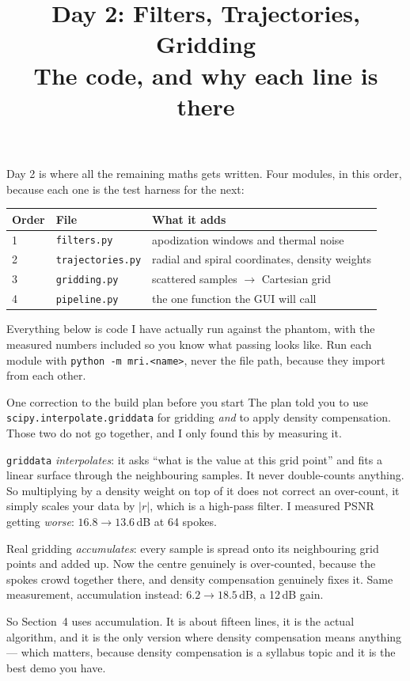 \documentclass[11pt,a4paper]{article}
\title{\textbf{Day 2: Filters, Trajectories, Gridding}\\[4pt]
\large The code, and why each line is there}
\author{}
\date{}
\begin{document}
\maketitle
\vspace{-2.1cm}

\section*{}

Day 2 is where all the remaining maths gets written. Four modules, in this
order, because each one is the test harness for the next:

\begin{center}
\begin{tabular}{@{}llp{7.6cm}@{}}
\toprule
\textbf{Order} & \textbf{File} & \textbf{What it adds} \\
\midrule
1 & \texttt{filters.py} & apodization windows and thermal noise \\
2 & \texttt{trajectories.py} & radial and spiral coordinates, density weights \\
3 & \texttt{gridding.py} & scattered samples $\to$ Cartesian grid \\
4 & \texttt{pipeline.py} & the one function the GUI will call \\
\bottomrule
\end{tabular}
\end{center}

Everything below is code I have actually run against the phantom, with the
measured numbers included so you know what passing looks like. Run each module
with \texttt{python -m mri.<name>}, never the file path, because they import
from each other.

\begin{bugbox}{One correction to the build plan before you start}
The plan told you to use \texttt{scipy.interpolate.griddata} for gridding
\emph{and} to apply density compensation. Those two do not go together, and I
only found this by measuring it.

\texttt{griddata} \emph{interpolates}: it asks ``what is the value at this grid
point'' and fits a linear surface through the neighbouring samples. It never
double-counts anything. So multiplying by a density weight on top of it does not
correct an over-count, it simply scales your data by $|r|$, which is a high-pass
filter. I measured PSNR getting \emph{worse}: $16.8 \to 13.6$\,dB at 64 spokes.

Real gridding \emph{accumulates}: every sample is spread onto its neighbouring
grid points and added up. Now the centre genuinely is over-counted, because the
spokes crowd together there, and density compensation genuinely fixes it. Same
measurement, accumulation instead: $6.2 \to 18.5$\,dB, a 12\,dB gain.

So Section~4 uses accumulation. It is about fifteen lines, it is the actual
algorithm, and it is the only version where density compensation means anything
--- which matters, because density compensation is a syllabus topic and it is
the best demo you have.
\end{bugbox}
\end{document}
